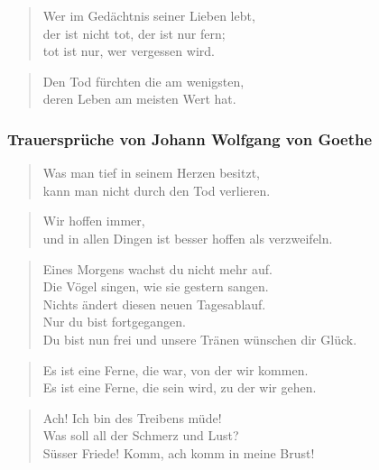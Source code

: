\documentclass[ngerman,a4paper,11pt]{scrreprt}
\begin{document}
\begin{verse}
Wer im Gedächtnis seiner Lieben lebt, \\
der ist nicht tot, der ist nur fern; \\
tot ist nur, wer vergessen wird. \\
\end{verse}

\begin{verse}
Den Tod fürchten die am wenigsten, \\
deren Leben am meisten Wert hat. \\
\end{verse}

\subsubsection*{Trauersprüche von Johann Wolfgang von Goethe}
\label{sec-1-1-1-3-13}

\begin{verse}
Was man tief in seinem Herzen besitzt, \\
kann man nicht durch den Tod verlieren. \\
\end{verse}

\begin{verse}
Wir hoffen immer, \\
und in allen Dingen ist besser hoffen als verzweifeln. \\
\end{verse}

\begin{verse}
Eines Morgens wachst du nicht mehr auf. \\
Die Vögel singen, wie sie gestern sangen. \\
Nichts ändert diesen neuen Tagesablauf. \\
Nur du bist fortgegangen. \\
Du bist nun frei und unsere Tränen wünschen dir Glück. \\
\end{verse}

\begin{verse}
Es ist eine Ferne, die war, von der wir kommen. \\
Es ist eine Ferne, die sein wird, zu der wir gehen. \\
\end{verse}

\begin{verse}
Ach! Ich bin des Treibens müde! \\
Was soll all der Schmerz und Lust? \\
Süsser Friede! Komm, ach komm in meine Brust! \\
\end{verse}
\end{document}
